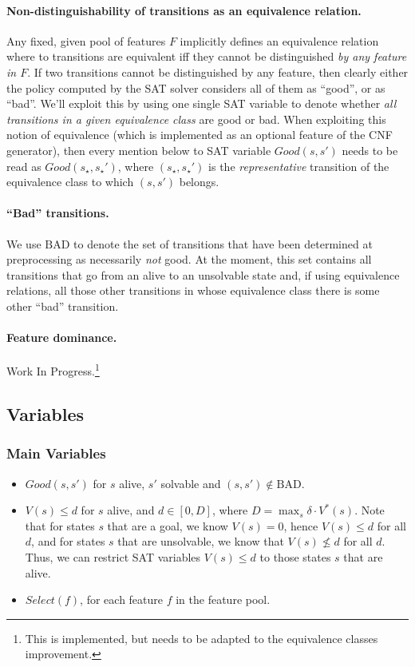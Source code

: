 \documentclass[a4paper]{article}
\newcommand{\badtx}{\ensuremath{\mathrm{BAD}}}
\begin{document}
\paragraph{Non-distinguishability of transitions as an equivalence relation.}
Any fixed, given pool of features $F$ implicitly defines an equivalence relation where to transitions are
equivalent iff they cannot be distinguished \emph{by any feature in $F$}.
If two transitions cannot be distinguished by any feature, then clearly either the policy computed by the SAT solver
considers all of them as ``good'', or as ``bad''.
We'll exploit this by using one single SAT variable to denote whether \emph{all transitions in a given equivalence
class} are good or bad. When exploiting this notion of equivalence (which is implemented as an optional feature of
the CNF generator), then every mention below to SAT variable $Good(s, s')$ needs to be read as $Good(s_{\star}, s_{\star}')$,
where $(s_{\star}, s_{\star}')$ is the \emph{representative} transition of the equivalence class to which $(s, s')$ belongs.

\paragraph{``Bad'' transitions.}
We use \badtx{} to denote the set of transitions that have been determined at preprocessing as necessarily
\emph{not} good.
At the moment, this set contains all transitions that go from an alive to an unsolvable state and, if using
equivalence relations, all those other transitions in whose equivalence class there is some other ``bad'' transition.


\paragraph{Feature dominance.}
Work In Progress.\footnote{This is implemented, but needs to be adapted to the equivalence classes improvement.}


\subsection{Variables}

\subsubsection{Main Variables}
\begin{itemize}
 \item $Good(s, s')$ for $s$ alive, $s'$ solvable and $(s, s') \not\in \badtx$.

 \item $V(s) \leq d$ for $s$ alive, and $d \in [0, D]$, where $D = \max_{s} \delta \cdot V^*(s)$.
 Note that for states $s$ that are a goal, we know $V(s)=0$, hence $V(s) \leq d$ for all $d$,
 and for states $s$ that are unsolvable, we know that $V(s) \not\leq d$ for all $d$.
 Thus, we can restrict SAT variables $V(s) \leq d$ to those states $s$ that are alive.

 \item $Select(f)$, for each feature $f$ in the feature pool.
\end{itemize}
\end{document}
